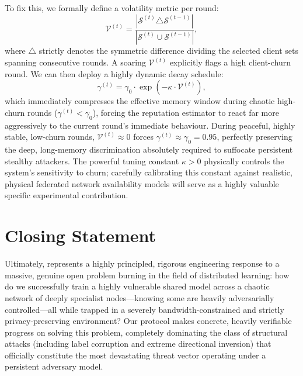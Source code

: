 \documentclass[../main.tex]{subfiles}
\begin{document}
To fix this, we formally define a volatility metric per round:
\begin{equation}
    \mathcal{V}^{(t)} = \frac{|\mathcal{S}^{(t)} \triangle \mathcal{S}^{(t-1)}|}{|\mathcal{S}^{(t)} \cup \mathcal{S}^{(t-1)}|},
    \label{eq:future_volatility}
\end{equation}
where $\triangle$ strictly denotes the symmetric difference dividing the selected client sets spanning consecutive rounds. A soaring $\mathcal{V}^{(t)}$ explicitly flags a high client-churn round. We can then deploy a highly dynamic decay schedule:
\begin{equation}
    \gamma^{(t)} = \gamma_0 \cdot \exp\!\left(-\kappa \cdot \mathcal{V}^{(t)}\right),
    \label{eq:future_dynamic_gamma}
\end{equation}
which immediately compresses the effective memory window during chaotic high-churn rounds ($\gamma^{(t)} < \gamma_0$), forcing the reputation estimator to react far more aggressively to the current round's immediate behaviour. During peaceful, highly stable, low-churn rounds, $\mathcal{V}^{(t)} \approx 0$ forces $\gamma^{(t)} \approx \gamma_0 = 0.95$, perfectly preserving the deep, long-memory discrimination absolutely required to suffocate persistent stealthy attackers. The powerful tuning constant $\kappa > 0$ physically controls the system's sensitivity to churn; carefully calibrating this constant against realistic, physical federated network availability models will serve as a highly valuable specific experimental contribution.

\section{Closing Statement}
\label{sec:conclusion_close}

Ultimately, \aegis{} represents a highly principled, rigorous engineering response to a massive, genuine open problem burning in the field of distributed learning: how do we successfully train a highly vulnerable shared model across a chaotic network of deeply specialist nodes---knowing some are heavily adversarially controlled---all while trapped in a severely bandwidth-constrained and strictly privacy-preserving environment? Our protocol makes concrete, heavily verifiable progress on solving this problem, completely dominating the class of structural attacks (including label corruption and extreme directional inversion) that officially constitute the most devastating threat vector operating under a persistent adversary model.
\end{document}
